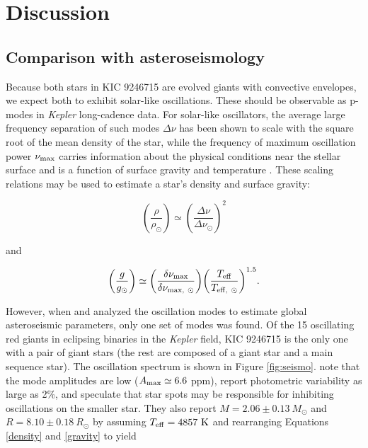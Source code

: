 \section{Discussion}\label{discuss}

\subsection{Comparison with asteroseismology}\label{seismo}

Because both stars in KIC 9246715 are evolved giants with convective envelopes, we expect both to exhibit solar-like oscillations. These should be observable as p-modes in \emph{Kepler} long-cadence data. For solar-like oscillators, the average large frequency separation of such modes $\Delta \nu$ has been shown to scale with the square root of the mean density of the star, while the frequency of maximum oscillation power $\nu_{\rm{max}}$ carries information about the physical conditions near the stellar surface and is a function of surface gravity and temperature \citep{cha13}. These scaling relations may be used to estimate a star's density and surface gravity:

\begin{equation} %
{\left( {\frac{\rho}{\rho_{\odot}}} \right)} \simeq {\left( {\frac{\Delta \nu}{\Delta \nu_{\odot}}} \right)}^{2}
\end{equation}

and

\begin{equation} %
{\left( \frac{g}{g_{\odot}} \right)} \simeq {\left( \frac{\delta \nu_{\rm{max}}}{\delta \nu_{\rm{max}, \ \odot}} \right)} {\left( \frac{T_{\rm{eff}}}{T_{\rm{eff}, \ \odot}} \right)}^{1.5}.
\end{equation}

However, when \citet{gau13} and \citet{gau14} analyzed the oscillation modes to estimate global asteroseismic parameters, only one set of modes was found. Of the 15 oscillating red giants in eclipsing binaries in the \emph{Kepler} field, KIC 9246715 is the only one with a pair of giant stars (the rest are composed of a giant star and a main sequence star). The oscillation spectrum is shown in Figure \ref{fig:seismo}. \citet{gau14} note that the mode amplitudes are low ($A_{\rm{max}} \simeq 6.6$ ppm), report photometric variability as large as 2\%, and speculate that star spots may be responsible for inhibiting oscillations on the smaller star. They also report $M = 2.06 \pm 0.13 \ M_{\odot}$ and $R = 8.10 \pm 0.18 \ R_{\odot}$ by assuming $T_{\rm{eff}} = 4857 \ \rm{K}$ and rearranging Equations \ref{density} and \ref{gravity} to yield

